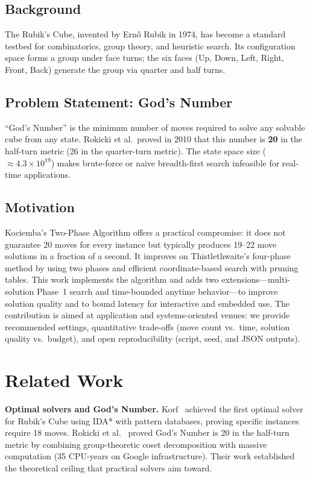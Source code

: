 \documentclass[10pt,twocolumn,a4paper]{article}
\begin{document}
\subsection{Background}
The Rubik's Cube, invented by Ern\H{o} Rubik in 1974, has become a standard testbed for combinatorics, group theory, and heuristic search. Its configuration space forms a group under face turns; the six faces (Up, Down, Left, Right, Front, Back) generate the group via quarter and half turns.

\subsection{Problem Statement: God's Number}
``God's Number'' is the minimum number of moves required to solve any solvable cube from any state. Rokicki et al.\ proved in 2010 that this number is \textbf{20} in the half-turn metric (26 in the quarter-turn metric). The state space size ($\approx 4.3 \times 10^{19}$) makes brute-force or naive breadth-first search infeasible for real-time applications.

\subsection{Motivation}
Kociemba's Two-Phase Algorithm offers a practical compromise: it does not guarantee 20 moves for every instance but typically produces 19--22 move solutions in a fraction of a second. It improves on Thistlethwaite's four-phase method by using two phases and efficient coordinate-based search with pruning tables. This work implements the algorithm and adds two extensions---multi-solution Phase~1 search and time-bounded anytime behavior---to improve solution quality and to bound latency for interactive and embedded use. The contribution is aimed at application and systems-oriented venues: we provide recommended settings, quantitative trade-offs (move count vs.\ time, solution quality vs.\ budget), and open reproducibility (script, seed, and JSON outputs).

\section{Related Work}
\label{sec:related}

\textbf{Optimal solvers and God's Number.}
Korf~\cite{korf1997} achieved the first optimal solver for Rubik's Cube using IDA* with pattern databases, proving specific instances require 18 moves.  Rokicki et al.~\cite{godnumber} proved God's Number is 20 in the half-turn metric by combining group-theoretic coset decomposition with massive computation (35 CPU-years on Google infrastructure).  Their work established the theoretical ceiling that practical solvers aim toward.
\end{document}
